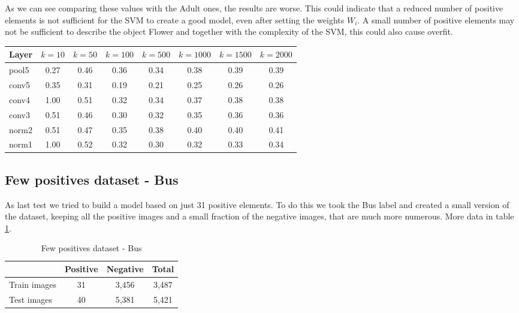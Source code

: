 As we can see comparing these values with the Adult ones, the results are worse.
This could indicate that a reduced number of positive elements is not sufficient
for the SVM to create a good model, even after setting the weights $W_i$. A
small number of positive elements may not be sufficient to describe the object
Flower and together with the complexity of the SVM, this could also cause
overfit.

\begin{table*}[t!]
\caption{Average precision on Flower - Polynomial degree 3}
\centering
\begin{tabular}{lccccccc}
    Layer       & $k=10$ & $k=50$ & $k=100$ & $k=500$ & $k=1000$ & $k=1500$ &
    $k=2000$ \\
    \midrule
    pool5        & 0.27 & 0.46 & 0.36 & 0.34 & 0.38 & 0.39 & 0.39 \\
    conv5        & 0.35 & 0.31 & 0.19 & 0.21 & 0.25 & 0.26 & 0.26 \\
    conv4        & 1.00 & 0.51 & 0.32 & 0.34 & 0.37 & 0.38 & 0.38 \\
    conv3        & 0.51 & 0.46 & 0.30 & 0.32 & 0.35 & 0.36 & 0.36 \\
    norm2        & 0.51 & 0.47 & 0.35 & 0.38 & 0.40 & 0.40 & 0.41 \\
    norm1        & 1.00 & 0.52 & 0.32 & 0.30 & 0.32 & 0.33 & 0.34 \\
\end{tabular}
\label{table:fl2}
\end{table*}

\subsection{Few positives dataset - Bus}

As last test we tried to build a model based on just 31 positive elements. To do
this we took the Bus label and created a small version of the dataset, keeping
all the positive images and a small fraction of the negative images, that are
much more numerous. More data in table \ref{table:ds3}.

\begin{table}[htbp]
\caption{Few positives dataset - Bus}
\centering
\begin{tabular}{l|cc|c}
       ~            & Positive & Negative & Total  \\
    \midrule                                     
    Train images    & 31   & 3,456       & 3,487  \\
    Test images     & 40   & 5,381       & 5,421  \\
\end{tabular}
\label{table:ds3}
\end{table}

